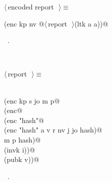 \documentclass[titlepage,12pt]{article}
\theoremstyle{definition}
\begin{document}
\begin{description}
\begin{flushleft} \small
\begin{minipage}{\linewidth} \label{scrap7}
$\langle\,$encoded report\nobreak\ {\footnotesize {}}$\,\rangle\equiv$
\vspace{-1ex}
\begin{list}{}{} \item
\mbox{}\verb@(enc kp nv @\hbox{$\langle\,$report\nobreak\ {\footnotesize {}}$\,\rangle$}\verb@ (ltk a a))@{\NWsep}
\end{list}
\vspace{-1ex}
\footnotesize\addtolength{\baselineskip}{-1ex}
\begin{list}{}{\setlength{\itemsep}{-\parsep}\setlength{\itemindent}{-\leftmargin}}
\item \NWtxtMacroRefIn\ .
\end{list}
\end{minipage}\\[4ex]
\end{flushleft}
\begin{flushleft} \small
\begin{minipage}{\linewidth} \label{scrap8}
$\langle\,$report\nobreak\ {\footnotesize {}}$\,\rangle\equiv$
\vspace{-1ex}
\begin{list}{}{} \item
\mbox{}\verb@@\\
\mbox{}\verb@(enc kp s jo m p@\\
\mbox{}\verb@  (enc@\\
\mbox{}\verb@     (enc "hash"@\\
\mbox{}\verb@        (enc "hash" a v r nv j jo hash)@\\
\mbox{}\verb@         m p hash)@\\
\mbox{}\verb@    (invk i))@\\
\mbox{}\verb@  (pubk v))@{\NWsep}
\end{list}
\vspace{-1ex}
\footnotesize\addtolength{\baselineskip}{-1ex}
\begin{list}{}{\setlength{\itemsep}{-\parsep}\setlength{\itemindent}{-\leftmargin}}
\item \NWtxtMacroRefIn\ .
\end{list}
\end{minipage}\\[4ex]
\end{flushleft}

\end{description}
\end{document}
